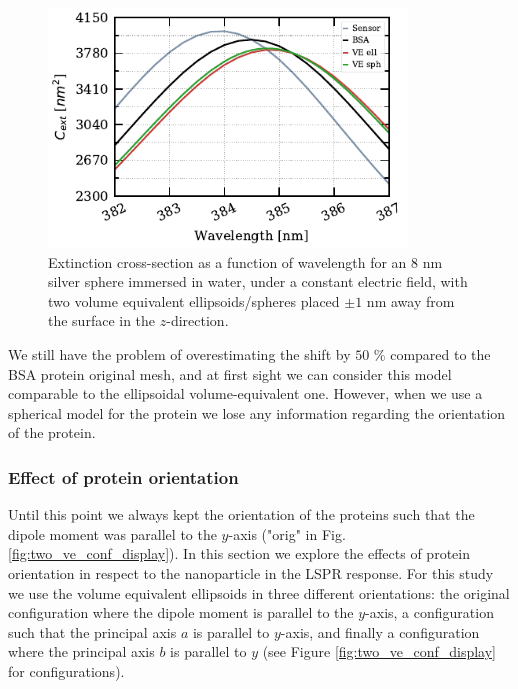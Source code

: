 \begin{figure} %
    \centering
    \includegraphics[width=0.85\textwidth]{two_ve_ell_sph_vs_BSA.pdf} 
    \caption{Extinction cross-section as a function of wavelength for an $8$ nm
    silver sphere immersed in water, under a constant electric field, with two volume equivalent 
    ellipsoids/spheres placed $\pm 1$ nm away from the surface in the $z$-direction.}
    \label{fig:sph_vs_ell_ve}
 \end{figure}

We still have the problem of overestimating the shift by $50$ $\%$ compared to the BSA protein original mesh, 
and at first sight we can consider this model comparable to the ellipsoidal volume-equivalent one. However, 
when we use a spherical model for the protein we lose any information regarding the orientation of the protein. 

\subsubsection{Effect of protein orientation}

Until this point we always kept the orientation of the proteins such that the dipole moment was parallel to the $y$-axis ("orig" in Fig. \ref{fig:two_ve_conf_display}). In this 
section we explore the effects of protein orientation in respect to the nanoparticle in the LSPR response. For this study we use the 
volume equivalent ellipsoids in three different orientations: the original configuration where the dipole moment is parallel to 
the $y$-axis, a configuration such that the principal axis $a$ is parallel to $y$-axis, 
and finally a configuration where the principal axis $b$ is parallel to $y$ (see Figure \ref{fig:two_ve_conf_display} for configurations). 
 
